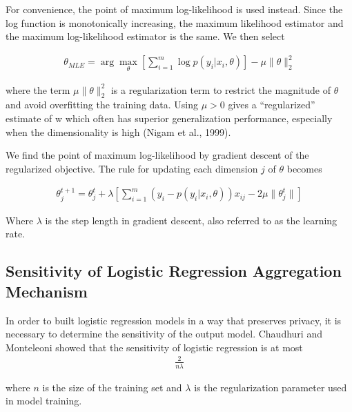 For convenience, the point of maximum log-likelihood is used instead. Since the log function is monotonically increasing, the maximum likelihood estimator and the maximum log-likelihood estimator is the same. We then select
 
  \begin{eqnarray}
  \theta_{MLE} = \arg\max_\theta [\sum_{i=1}^{m} \log p(y_i | x_i,\theta)] - \mu \|\theta\|^{2}_{2}
  \end{eqnarray}
  
where the term $\mu\|\theta\|^{2}_{2}$ is a regularization term to restrict the magnitude of $\theta$ and avoid overfitting the training data. Using $\mu > 0$ gives a “regularized” estimate of w which often has superior generalization performance, especially when the dimensionality is high (Nigam et al., 1999). 
  
We find the point of maximum log-likelihood by gradient descent of the regularized objective. The rule for updating each dimension $j$ of $\theta$ becomes

\begin{eqnarray}
\theta^{t+1}_j = \theta^{t}_j + \lambda[\sum_{i=1}^{m}(y_i - p(y_i | x_i,\theta))x_{ij} - 2\mu \|\theta^{t}_j\|]
\end{eqnarray}

Where $\lambda$ is the step length in gradient descent, also referred to as the learning rate.


\subsection{Sensitivity of Logistic Regression Aggregation Mechanism} \label{sec:Sensitivity_of_LogReg}

In order to built logistic regression models in a way that preserves privacy, it is necessary to determine the sensitivity of the output model. Chaudhuri and Monteleoni\cite{chaudhuri2009logistic} showed that the sensitivity of logistic regression is at most 
\begin{eqnarray}\label{eq:logres_sensitivity}
\frac{2}{n\lambda}
\end{eqnarray}

where $n$ is the size of the training set and $\lambda$ is the regularization parameter used in model training.


